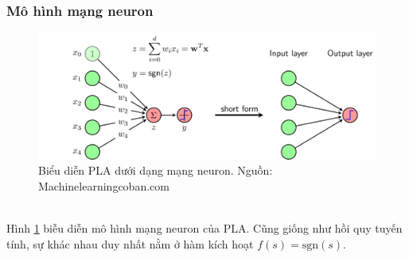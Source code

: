 \documentclass{article}
\begin{document}
\subsubsection*{Mô hình mạng neuron}
\begin{figure}[ht!]
    \centering
    \includegraphics[width = \linewidth]{pla_nn.png}
    \caption{Biểu diễn PLA dưới dạng mạng neuron. Nguồn: Machinelearningcoban.com}
    \label{fig11}
\end{figure}
\phantom{a}\\
Hình \ref{fig11} biễu diễn mô hình mạng neuron của PLA. Cũng giống như hồi quy tuyến tính, sự khác nhau duy nhất nằm ở hàm kích hoạt $f(s) = \text{sgn}(s)$.
\end{document}

